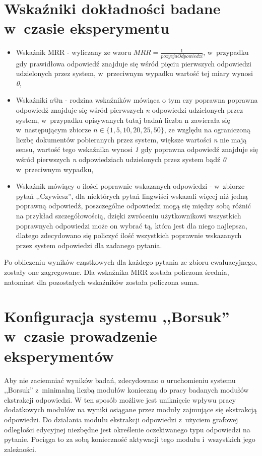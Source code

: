 \documentclass[a4paper, twoside, 12pt]{report}
\begin{document}
    \section{Wskaźniki dokładności badane w~czasie eksperymentu}
        \begin{itemize}
            \item Wskaźnik MRR - wyliczany ze wzoru $ MRR = \frac{1}{pozycjaOdpowiedzi} $, w~przypadku gdy prawidłowa
                odpowiedź znajduje się wśród pięciu pierwszych odpowiedzi udzielonych przez system, w~przeciwnym wypadku
                wartość tej miary wynosi \emph{0},
            \item Wskaźniki a@n - rodzina wskaźników mówiąca o tym czy poprawna poprawna odpowiedź znajduje się wśród
                pierwszych \emph{n} odpowiedzi udzielonych przez system, w~przypadku opisywanych tutaj badań liczba
                n zawierała się w~następującym zbiorze $ n \in \{1, 5, 10, 20, 25, 50\} $, ze względu na ograniczoną
                liczbę dokumentów pobieranych przez system, większe wartości \emph{n} nie mają sensu, wartość tego
                wskaźnika wynosi \emph{1} gdy poprawna odpowiedź znajduje się wśród pierwszych \emph{n} odpowiedziach
                udzielonych przez system bądź \emph{0} w~przeciwnym wypadku,
           \item Wskaźnik mówiący o ilości poprawnie wskazanych odpowiedzi - w~zbiorze pytań ,,Czywiesz'', dla niektórych
               pytań lingwiści wskazali więcej niż jedną poprawną odpowiedź, poszczególne odpowiedzi mogą się między
               sobą różnić na przykład szczegółowością, dzięki zwróceniu użytkownikowi wszystkich poprawnych odpowiedzi
               może on wybrać tą, która jest dla niego najlepsza, dlatego zdecydowano się policzyć ilość wszystkich
               poprawnie wskazanych przez system odpowiedzi dla zadanego pytania.
        \end{itemize}

        Po obliczeniu wyników cząstkowych dla każdego pytania ze zbioru ewaluacyjnego, zostały one zagregowane. Dla wskaźnika
        MRR została policzona średnia, natomiast dla pozostałych wskaźników została policzona suma.

     \section{Konfiguracja systemu ,,Borsuk'' w~czasie prowadzenie eksperymentów}
        Aby nie zaciemniać wyników badań, zdecydowano o uruchomieniu systemu ,,Borsuk'' z~minimalną liczbą modułów
        konieczną do pracy badanych modułów ekstrakcji odpowiedzi. W ten sposób możliwe jest uniknięcie wpływu pracy
        dodatkowych modułów na wyniki osiągane przez moduły zajmujące się ekstrakcją odpowiedzi. Do działania modułu
        ekstrakcji odpowiedzi z~użyciem grafowej odległości edycyjnej niezbędne jest określenie oczekiwanego typu
        odpowiedzi na pytanie. Pociąga to za sobą konieczność aktywacji tego modułu i~wszystkich jego zależności.
\end{document}
